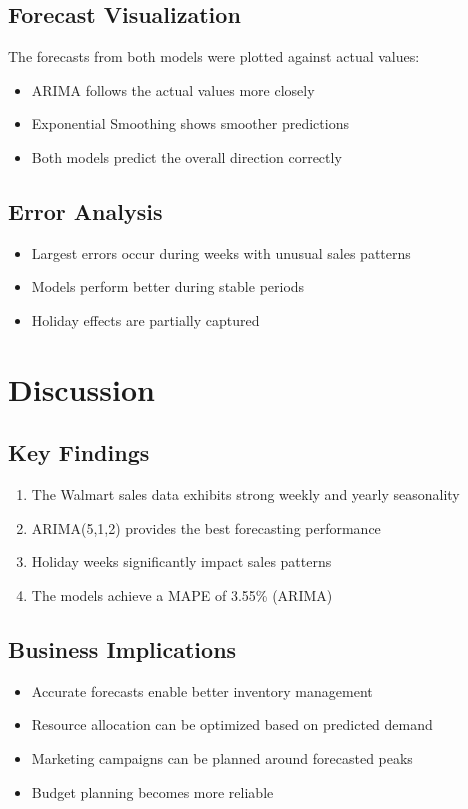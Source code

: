 \documentclass[12pt,a4paper]{report}
\begin{document}
\section{Forecast Visualization}
The forecasts from both models were plotted against actual values:
\begin{itemize}
    \item ARIMA follows the actual values more closely
    \item Exponential Smoothing shows smoother predictions
    \item Both models predict the overall direction correctly
\end{itemize}

\section{Error Analysis}
\begin{itemize}
    \item Largest errors occur during weeks with unusual sales patterns
    \item Models perform better during stable periods
    \item Holiday effects are partially captured
\end{itemize}

\chapter{Discussion}
\label{ch:discussion}

\section{Key Findings}
\begin{enumerate}
    \item The Walmart sales data exhibits strong weekly and yearly seasonality
    \item ARIMA(5,1,2) provides the best forecasting performance
    \item Holiday weeks significantly impact sales patterns
    \item The models achieve a MAPE of 3.55\% (ARIMA)
\end{enumerate}

\section{Business Implications}
\begin{itemize}
    \item Accurate forecasts enable better inventory management
    \item Resource allocation can be optimized based on predicted demand
    \item Marketing campaigns can be planned around forecasted peaks
    \item Budget planning becomes more reliable
\end{itemize}
\end{document}
